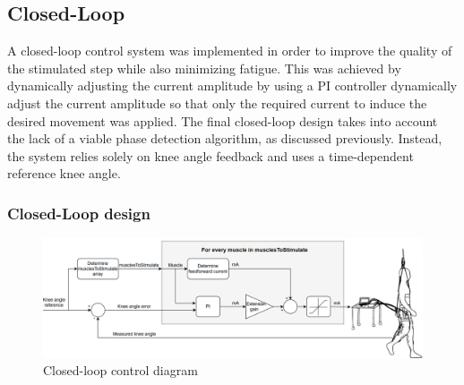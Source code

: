 \subsection{Closed-Loop}
A closed-loop control system was implemented in order to improve the quality of the stimulated step while also minimizing fatigue. This was achieved by dynamically adjusting the current amplitude by using a  PI controller dynamically adjust the current amplitude so that only the required current to induce the desired movement was applied. The final closed-loop design takes into account the lack of a viable phase detection algorithm, as discussed previously. Instead, the system relies solely on knee angle feedback and uses a time-dependent reference knee angle.

\subsubsection{Closed-Loop design}

\begin{figure} [H]
    \centering
    \includegraphics[width=0.98\linewidth]{images/controldiam3.png}
    \caption{Closed-loop control diagram}
    \label{fig:cldiam}
\end{figure}

